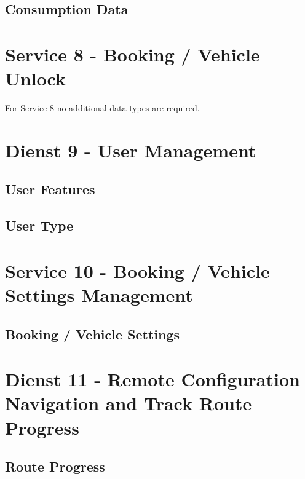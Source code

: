 \subsection*{Consumption Data}



\section{Service 8 - Booking / Vehicle Unlock}
\label{sec:Datenmodell:Dienst8}
For Service 8 no additional data types are required.

\section{Dienst 9 - User Management}
\label{sec:Datenmodell:Dienst9}

\subsection*{User Features}



\subsection*{User Type}



\section{Service 10 - Booking / Vehicle Settings Management}
\label{sec:Datenmodell:Dienst10}

\subsection*{Booking / Vehicle Settings}



\section{Dienst 11 - Remote Configuration Navigation and Track Route Progress}
\label{sec:Datenmodell:Dienst11}

\subsection*{Route Progress}



